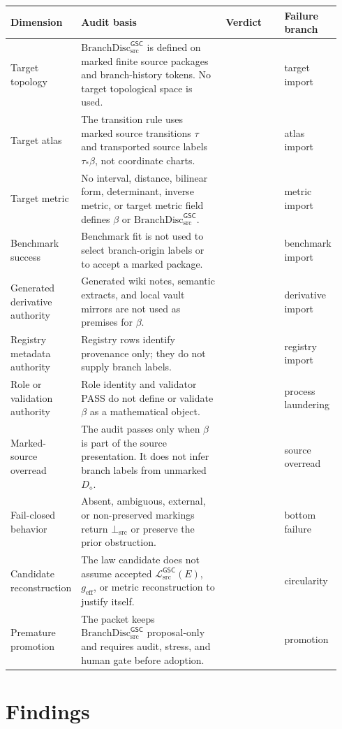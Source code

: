 \documentclass[11pt]{article}
\newcommand{\MetricData}{\mathcal{L}_{\mathrm{src}}^{\mathsf{GSC}}}
\newcommand{\BottomSrc}{\bot_{\mathrm{src}}}
\newcommand{\geff}{g_{\mathrm{eff}}}
\newcommand{\Diamond}{D_{\diamond}}
\newcommand{\BranchDisc}{\mathrm{BranchDisc}_{\mathrm{src}}^{\mathsf{GSC}}}
\newcommand{\Pass}{\mathrm{pass\_no\_smuggling\_detected}}
\begin{document}
\begin{longtable}{p{0.20\linewidth}p{0.45\linewidth}p{0.18\linewidth}p{0.11\linewidth}}
\toprule
Dimension & Audit basis & Verdict & Failure branch \\
\midrule
Target topology &
\(\BranchDisc\) is defined on marked finite source packages and branch-history
tokens. No target topological space is used. &
\Pass & target import \\
Target atlas &
The transition rule uses marked source transitions \(\tau\) and transported
source labels \(\tau_\ast\beta\), not coordinate charts. &
\Pass & atlas import \\
Target metric &
No interval, distance, bilinear form, determinant, inverse metric, or target
metric field defines \(\beta\) or \(\BranchDisc\). &
\Pass & metric import \\
Benchmark success &
Benchmark fit is not used to select branch-origin labels or to accept a
marked package. &
\Pass & benchmark import \\
Generated derivative authority &
Generated wiki notes, semantic extracts, and local vault mirrors are not used
as premises for \(\beta\). &
\Pass & derivative import \\
Registry metadata authority &
Registry rows identify provenance only; they do not supply branch labels. &
\Pass & registry import \\
Role or validation authority &
Role identity and validator PASS do not define or validate \(\beta\) as a
mathematical object. &
\Pass & process laundering \\
Marked-source overread &
The audit passes only when \(\beta\) is part of the source presentation. It
does not infer branch labels from unmarked \(\Diamond\). &
\Pass & source overread \\
Fail-closed behavior &
Absent, ambiguous, external, or non-preserved markings return \(\BottomSrc\)
or preserve the prior obstruction. &
\Pass & bottom failure \\
Candidate reconstruction &
The law candidate does not assume accepted \(\MetricData(E)\), \(\geff\), or
metric reconstruction to justify itself. &
\Pass & circularity \\
Premature promotion &
The packet keeps \(\BranchDisc\) proposal-only and requires audit, stress, and
human gate before adoption. &
\Pass & promotion \\
\bottomrule
\end{longtable}

\section{Findings}
\end{document}
